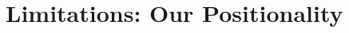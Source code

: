 \documentclass[manuscript,review,anonymous]{acmart}
\begin{document}




\section{Limitations: Our Positionality}
\end{document}
